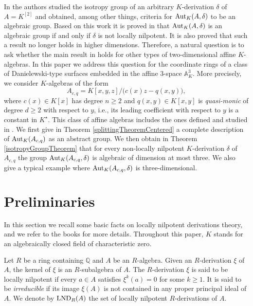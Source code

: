 \documentclass{article}
\newcommand \Q {\mathbb{Q}}
\renewcommand \a {A}
\newcommand \ring {R}
\renewcommand \k {K}
\newcommand \affine {\mathbb{A}}
\newcommand \auto {{\rm Aut}}
\newcommand \lnd {{\rm LND}}
\begin{document}
{\medskip In \cite{baltazarPan_2021} the authors studied the isotropy group of an arbitrary $\k$-derivation $\delta$ of $\a=\k^{[2]}$ and obtained, among other things, criteria for $\auto_{\k}(\a,\delta)$ to be an algebraic group. Based on this work it is proved in \cite{pan_2022} that $\auto_{\k}(\a,\delta)$ is an algebraic group if and only if $\delta$ is not locally nilpotent. It is also proved that such a result no longer holds in higher dimensions. Therefore, a natural question is to ask whether the main result in \cite{pan_2022} holds for other types of two-dimensional affine $\k$-algebras. In this paper we address this question for the coordinate rings of a class of Danielewski-type surfaces embedded in the affine $3$-space $\affine_{\k}^3$. More precisely, we consider $\k$-algebras of the form $$\a_{c,q}=\k[x,y,z]/\big(c(x)z-q(x,y)\big),$$ where $c(x)\in\k[x]$ has degree $n\geq 2$ and $q(x,y)\in\k[x,y]$ is {\it quasi-monic} of degree $d\geq 2$ with respect to $y$, i.e., its leading coefficient with respect to $y$ is a constant in $\k^{\star}$. This class of affine algebras includes the ones defined and studied in 
\cite{makar-limanov_2001,bianchi_vesolo_2017}. We first give in Theorem \ref{splittingTheoremCentered} a complete description of $\auto_{\k}(\a_{c,q})$ as an abstract group. We then obtain in Theorem \ref{isotropyGroupTheorem} that for every non-locally nilpotent $\k$-derivation $\delta$ of $\a_{c,q}$ the group $\auto_{\k}(\a_{c,q},\delta)$ is algebraic of dimension at most three. We also give a typical example where $\auto_{\k}(\a_{c,q},\delta)$ is three-dimensional.

\section{Preliminaries}\label{sec:prelim}In this section we recall some basic facts on locally nilpotent derivations theory, and we refer to the books \cite{miyanishi_book,essen_book,freudenburg_book} for more details. Throughout this paper, $\k$ stands for an algebraically closed field of characteristic zero.

\medskip Let $\ring$ be a ring containing $\Q$ and $A$ be an $\ring$-algebra. Given an $\ring$-derivation $\xi$ of $\a$, the kernel of $\xi$ is an $\ring$-subalgebra of $\a$. The $\ring$-derivation $\xi$ is said to be locally nilpotent if every $a\in A$ satisfies $\xi^k(a)=0$ for some $k\geq 1$. It is said to be {\it irreducible} if its image $\xi(A)$ is not contained in any proper principal ideal of $\a$. We denote by $\lnd_{\ring}(A)$ the set of locally nilpotent $\ring$-derivations of $A$. 

}
\end{document}
